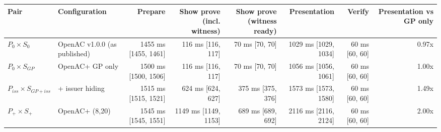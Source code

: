 \begin{tabular}{llrrrrrr}
\toprule
Pair & Configuration & Prepare & Show prove (incl. witness) & Show prove (witness ready) & Presentation & Verify & Presentation vs GP only \\
\midrule
$P_0\times S_0$ & OpenAC v1.0.0 (as published) & 1455 ms [1455, 1461] & 116 ms [116, 117] & 70 ms [70, 70] & 1029 ms [1029, 1034] & 60 ms [60, 60] & 0.97x \\
$P_0\times S_{GP}$ & OpenAC+ GP only & 1500 ms [1500, 1506] & 116 ms [116, 117] & 70 ms [70, 70] & 1056 ms [1056, 1061] & 60 ms [60, 60] & 1.00x \\
$P_{iss}\times S_{GP+iss}$ & + issuer hiding & 1515 ms [1515, 1521] & 624 ms [624, 627] & 375 ms [375, 376] & 1573 ms [1573, 1580] & 60 ms [60, 60] & 1.49x \\
$P_+\times S_+$ & OpenAC+ (8,20) & 1545 ms [1545, 1551] & 1149 ms [1149, 1153] & 689 ms [689, 692] & 2116 ms [2116, 2124] & 60 ms [60, 60] & 2.00x \\
\bottomrule
\end{tabular}
